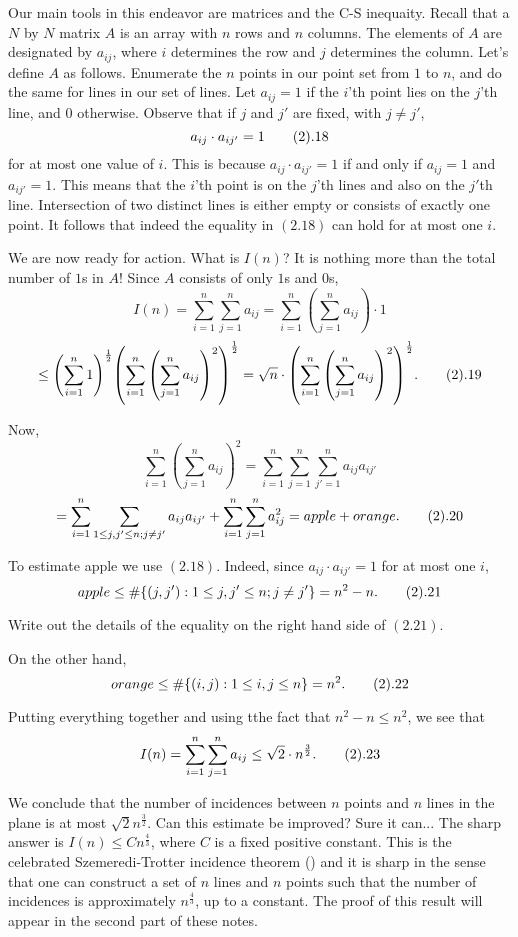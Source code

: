 Our main tools in this endeavor are matrices and the C-S inequaity. Recall
that a $N$ by $N$ matrix $A$ is an array with $n$ rows and $n$ columns.
The elements of $A$ are designated by $a_{ij}$, where $i$ determines the
row and $j$ determines the column. Let's define $A$ as follows.
Enumerate the $n$ points in our point set from $1$ to $n$, and do the
same for lines in our set of lines. Let $a_{ij}=1$ if the $i$'th point
lies on the $j$'th line, and $0$ otherwise. Observe that if $j$ and $j'$
are fixed, with $j \not=j'$,
$$ a_{ij} \cdot a_{ij'}=1 \tag2.18$$ for at most one value of $i$. This
is because $a_{ij} \cdot a_{ij'}=1$ if and only if $a_{ij}=1$ and
$a_{ij'}=1$. This means that the $i$'th point is on the $j$'th lines and
also on the $j'$th line. Intersection of two distinct lines is either
empty or consists of exactly one point. It follows that indeed the
equality in $(2.18)$ can hold for at most one $i$.

We are now ready for action. What is $I(n)$? It is nothing more than the
total number of $1$s in $A$! Since $A$ consists of only $1$s and $0$s,
$$ I(n)=\sum_{i=1}^n \sum_{j=1}^n a_{ij}=\sum_{i=1}^n \left(\sum_{j=1}^n
a_{ij}\right) \cdot 1$$
$$ \leq {\left(\sum_{i=1}^n 1 \right)}^{\frac{1}{2}} {\left( \sum_{i=1}^n
{\left( \sum_{j=1}^n a_{ij} \right)}^2 \right)}^{\frac{1}{2}}=\sqrt{n}
\cdot {\left( \sum_{i=1}^n
{\left( \sum_{j=1}^n a_{ij} \right)}^2 \right)}^{\frac{1}{2}}. \tag2.19$$

Now,
$$ \sum_{i=1}^n
{\left( \sum_{j=1}^n a_{ij} \right)}^2=\sum_{i=1}^n \sum_{j=1}^n
\sum_{j'=1}^n a_{ij}a_{ij'}$$
$$=\sum_{i=1}^n \sum_{1 \leq j,j' \leq n; j \not=j'}
a_{ij}a_{ij'}+\sum_{i=1}^n \sum_{j=1}^n a_{ij}^2=apple+orange. \tag2.20$$

To estimate apple we use $(2.18)$. Indeed, since $a_{ij} \cdot a_{ij'}=1$
for at most one $i$,
$$ apple \leq \# \{(j,j'): 1 \leq j,j' \leq n; j \not=j'\}=n^2-n.
\tag2.21$$

 Write out the details of the equality on the
right hand side of $(2.21)$. \endproclaim


On the other hand,
$$ orange \leq \# \{(i,j): 1 \leq i,j \leq n\}=n^2. \tag2.22$$

Putting everything together and using tthe fact that $n^2-n \leq n^2$, we
see that
$$ I(n)=\sum_{i=1}^n \sum_{j=1}^n a_{ij} \leq \sqrt{2} \cdot
n^{\frac{3}{2}}. \tag2.23$$

We conclude that the number of incidences between $n$ points and $n$
lines in the plane is at most $\sqrt{2}n^{\frac{3}{2}}$. Can this
estimate be improved? Sure it can... The sharp answer is $I(n) \leq
Cn^{\frac{4}{3}}$, where $C$ is a fixed positive constant. This is the
celebrated Szemeredi-Trotter incidence theorem (\cite{ST83}) and it is
sharp in the sense that one can construct a set of $n$ lines and $n$
points such that the number of incidences is approximately
$n^{\frac{4}{3}}$, up to a constant. The proof of this result will appear
in the second part of these notes.

